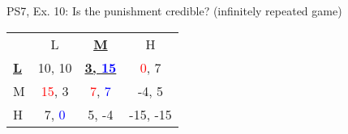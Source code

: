 \begin{frame}{PS7, Ex. 10: Is the punishment credible? (infinitely repeated game)}
\begin{multicols}{2}
    \begin{table}
      \begin{tabular}{l|c|c|c|}
        \multicolumn{1}{c}{} & \multicolumn{1}{c}{L} & \multicolumn{1}{c}{\textbf{\underline{M}}} & \multicolumn{1}{c}{H} \\\cline{2-4}
        \textbf{\underline{L}} & 10, 10 & \textbf{\underline{3, \textcolor{blue}{15}}} & \textcolor{red}{0}, 7 \\\cline{2-4}
        M & \textcolor{red}{15}, 3 & \textcolor{red}{7}, \textcolor{blue}{7} & -4, 5 \\\cline{2-4}
        H & 7, \textcolor{blue}{0} & 5, -4 & -15, -15 \\\cline{2-4}
      \end{tabular}
    \end{table}
    \vfill\null
  \end{multicols}
  \vfill\null
\end{frame}

